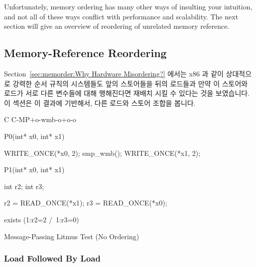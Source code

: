Unfortunately, memory ordering has many other ways of insulting your
intuition, and not all of these ways conflict with performance and
scalability.
The next section will give an overview of reordering of unrelated
memory reference.
\fi

\subsection{Memory-Reference Reordering}
\label{sec:memorder:Memory-Reference Reordering}

Section~\ref{sec:memorder:Why Hardware Misordering?}
에서는 x86 과 같이 상대적으로 강력한 순서 규칙의 시스템들도 앞의 스토어들을
뒤의 로드들과 만약 이 스토어와 로드가 서로 다른 변수들에 대해 행해진다면 재배치
시킬 수 있다는 것을 보였습니다.
이 섹션은 이 결과에 기반해서, 다른 로드와 스토어 조합을 봅니다.

\begin{listing}[tbp]
{ \scriptsize
\begin{verbbox}[\LstLineNo]
C C-MP+o-wmb-o+o-o

{
}


P0(int* x0, int* x1) {

  WRITE_ONCE(*x0, 2);
  smp_wmb();
  WRITE_ONCE(*x1, 2);

}

P1(int* x0, int* x1) {

  int r2;
  int r3;

  r2 = READ_ONCE(*x1);
  r3 = READ_ONCE(*x0);

}

exists (1:r2=2 /\ 1:r3=0)
\end{verbbox}
}
\centering
\theverbbox
\caption{Message-Passing Litmus Test (No Ordering)}
\label{lst:memorder:Message-Passing Litmus Test (No Ordering)}
\end{listing}

\subsubsection{Load Followed By Load}
\label{sec:memorder:Load Followed By Load}

